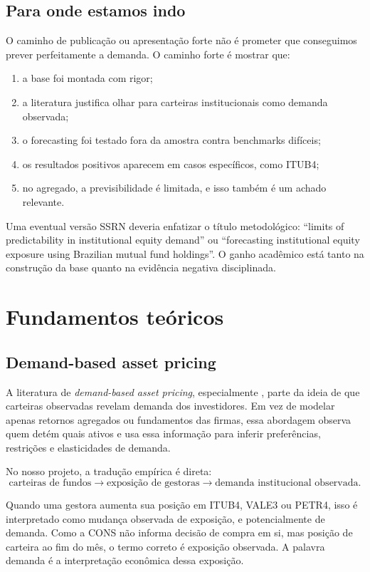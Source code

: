 \documentclass[11pt,a4paper]{article}
\begin{document}
\subsection{Para onde estamos indo}

O caminho de publicação ou apresentação forte não é prometer que conseguimos prever perfeitamente a demanda.
O caminho forte é mostrar que:
\begin{enumerate}
\item a base foi montada com rigor;
\item a literatura justifica olhar para carteiras institucionais como demanda observada;
\item o forecasting foi testado fora da amostra contra benchmarks difíceis;
\item os resultados positivos aparecem em casos específicos, como ITUB4;
\item no agregado, a previsibilidade é limitada, e isso também é um achado relevante.
\end{enumerate}

Uma eventual versão SSRN deveria enfatizar o título metodológico: ``limits of predictability in institutional
equity demand'' ou ``forecasting institutional equity exposure using Brazilian mutual fund holdings''. O
ganho acadêmico está tanto na construção da base quanto na evidência negativa disciplinada.

\section{Fundamentos teóricos}

\subsection{Demand-based asset pricing}

A literatura de \emph{demand-based asset pricing}, especialmente \citet{koijenyogo2019}, parte da ideia de
que carteiras observadas revelam demanda dos investidores. Em vez de modelar apenas retornos agregados ou
fundamentos das firmas, essa abordagem observa quem detém quais ativos e usa essa informação para inferir
preferências, restrições e elasticidades de demanda.

No nosso projeto, a tradução empírica é direta:
\[
\text{carteiras de fundos} \rightarrow \text{exposição de gestoras} \rightarrow \text{demanda institucional observada}.
\]

Quando uma gestora aumenta sua posição em ITUB4, VALE3 ou PETR4, isso é interpretado como mudança observada
de exposição, e potencialmente de demanda. Como a CONS não informa decisão de compra em si, mas posição de
carteira ao fim do mês, o termo correto é exposição observada. A palavra demanda é a interpretação
econômica dessa exposição.
\end{document}
